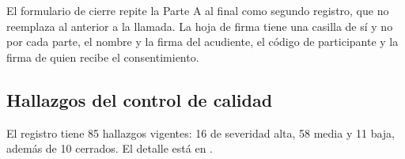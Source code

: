 El formulario de cierre repite la Parte A al final como segundo registro, que no reemplaza al anterior a la llamada. La hoja de firma tiene una casilla de sí y no por cada parte, el nombre y la firma del acudiente, el código de participante y la firma de quien recibe el consentimiento.




\subsection{Hallazgos del control de calidad}
\label{sec:anexo-hallazgos}
El registro tiene 85 hallazgos vigentes: 16 de severidad alta, 58 media y 11 baja, además de 10 cerrados. El detalle está en .



